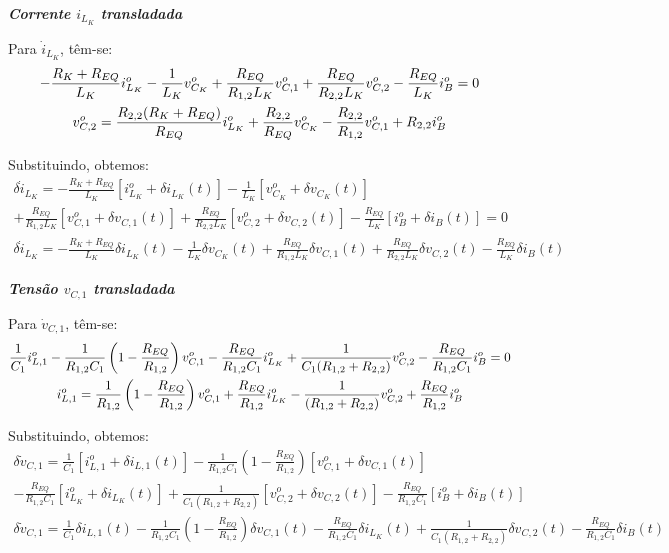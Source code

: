 \documentclass{article}
\newcommand{\nle}{%
  \notag \\[0pt]
}
\begin{document}
\textbf{\textit{Corrente $i_{L_K}$ transladada}} \vspace*{12pt}

Para $\dot{i}_{L_K}$, têm-se:
\begin{gather}
  - \frac{R_K + R_{EQ}}{L_K} i_{L_K}^o - \frac{1}{L_K} v_{C_K}^o + \frac{R_{EQ}}{{R_{1,2}}L_K} v_{C,1}^o + \frac{R_{EQ}}{R_{2,2}L_K} v_{C,2}^o - \frac{R_{EQ}}{L_K} i_B^o= 0 \nle
  v_{C,2}^o = \frac{R_{2,2}(R_K + R_{EQ})}{R_{EQ}} i_{L_K}^o + \frac{R_{2,2}}{R_{EQ}} v_{C_K}^o - \frac{R_{2,2}}{{R_{1,2}}} v_{C,1}^o + R_{2,2}i_B^o
\end{gather}

Substituindo, obtemos:
\begin{multline*}
  \delta \dot{i}_{L_K} = - \frac{R_K + R_{EQ}}{L_K} \left[i_{L_K}^o + \delta i_{L_K}(t)\right]
  - \frac{1}{L_K} \left[v_{C_K}^o + \delta v_{C_K}(t)\right] \\
  + \frac{R_{EQ}}{{R_{1,2}}L_K} \left[v_{C,1}^o + \delta v_{C,1}(t)\right]
  + \frac{R_{EQ}}{R_{2,2}L_K} \left[v_{C,2}^o + \delta v_{C,2}(t)\right] - \frac{R_{EQ}}{L_K} \left[i_B^o + \delta i_B(t)\right] = 0
\end{multline*}
\begin{gather}
  \delta \dot{i}_{L_K} = - \frac{R_K + R_{EQ}}{L_K} \delta i_{L_K}(t)
  - \frac{1}{L_K} \delta v_{C_K}(t)
  + \frac{R_{EQ}}{{R_{1,2}}L_K} \delta v_{C,1}(t)
  + \frac{R_{EQ}}{R_{2,2}L_K} \delta v_{C,2}(t)
  - \frac{R_{EQ}}{L_K} \delta i_B(t)
\end{gather}

\textbf{\textit{Tensão $v_{C,1}$ transladada}} \vspace*{12pt}

Para $\dot{v}_{C,1}$, têm-se:
\begin{gather}
  \frac{1}{C_1} i_{L,1}^o - \frac{1}{R_{1,2}C_1} \left(1 - \frac{R_{EQ}}{{R_{1,2}}}\right) v_{C,1}^o - \frac{R_{EQ}}{R_{1,2} C_1} i_{L_K}^o + \frac{1}{C_1 (R_{1,2} + R_{2,2})} v_{C,2}^o - \frac{R_{EQ}}{R_{1,2}C_1} i_B^o = 0 \nle
  i_{L,1}^o = \frac{1}{R_{1,2}} \left(1 - \frac{R_{EQ}}{{R_{1,2}}}\right) v_{C,1}^o + \frac{R_{EQ}}{R_{1,2} } i_{L_K}^o - \frac{1}{ (R_{1,2} + R_{2,2})} v_{C,2}^o + \frac{R_{EQ}}{R_{1,2}} i_B^o
\end{gather}

Substituindo, obtemos:
\begin{multline*}
  \delta \dot v_{C,1} = \frac{1}{C_1} \left[i_{L,1}^o + \delta i_{L,1}(t)\right]
  - \frac{1}{R_{1,2}C_1} \left(1 - \frac{R_{EQ}}{{R_{1,2}}}\right) \left[v_{C,1}^o + \delta v_{C,1}(t)\right] \\
  - \frac{R_{EQ}}{R_{1,2} C_1} \left[i_{L_K}^o + \delta i_{L_K}(t)\right]
  + \frac{1}{C_1 (R_{1,2} + R_{2,2})} \left[v_{C,2}^o + \delta v_{C,2}(t) \right]
  - \frac{R_{EQ}}{R_{1,2} C_1} \left[i_B^o + \delta i_B(t)\right]
\end{multline*}
\begin{gather}
  \delta \dot v_{C,1} = \frac{1}{C_1} \delta i_{L,1}(t)
  - \frac{1}{R_{1,2}C_1} \left(1 - \frac{R_{EQ}}{{R_{1,2}}}\right) \delta v_{C,1}(t)
  - \frac{R_{EQ}}{R_{1,2} C_1} \delta i_{L_K}(t)
  + \frac{1}{C_1 (R_{1,2} + R_{2,2})} \delta v_{C,2}(t)
  - \frac{R_{EQ}}{R_{1,2} C_1} \delta i_B(t)
\end{gather}
\end{document}
